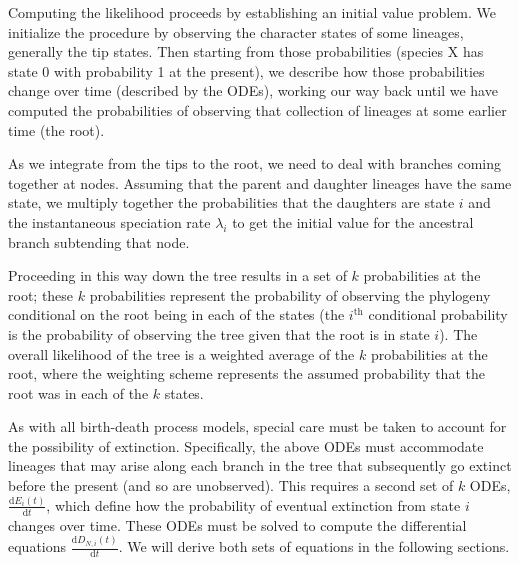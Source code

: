 Computing the likelihood proceeds by establishing an initial value problem.
We initialize the procedure by observing the character states of some lineages, generally the tip states.
Then starting from those probabilities (\EG species X has state 0 with probability 1 at the present), we describe how those probabilities change over time (described by the ODEs), working our way back until we have computed the probabilities of observing that collection of lineages at some earlier time (\EG the root).

As we integrate from the tips to the root, we need to deal with branches coming together at nodes.
Assuming that the parent and daughter lineages have the same state, we multiply together the probabilities that the daughters are state $i$ and the instantaneous speciation rate $\lambda_i$ to get the initial value for the ancestral branch subtending that node.

Proceeding in this way down the tree results in a set of $k$ probabilities at the root; these $k$ probabilities represent the probability of observing the phylogeny conditional on the root being in each of the states (\IE the $i^\text{th}$ conditional probability is the probability of observing the tree given that the root is in state $i$).
The overall likelihood of the tree is a weighted average of the $k$ probabilities at the root, where the weighting scheme represents the assumed probability that the root was in each of the $k$ states.

As with all birth-death process models, special care must be taken to account for the possibility of extinction.
Specifically, the above ODEs must accommodate lineages that may arise along each branch in the tree that subsequently go extinct before the present (and so are unobserved).
This requires a second set of $k$ ODEs, $\frac{ \mathrm{d}E_{i}(t)}{\mathrm{d}t}$, which define how the probability of eventual extinction from state $i$ changes over time.
These ODEs must be solved to compute the differential equations $\frac{ \mathrm{d}D_{N,i}(t)}{\mathrm{d}t}$.
We will derive both sets of equations in the following sections.


